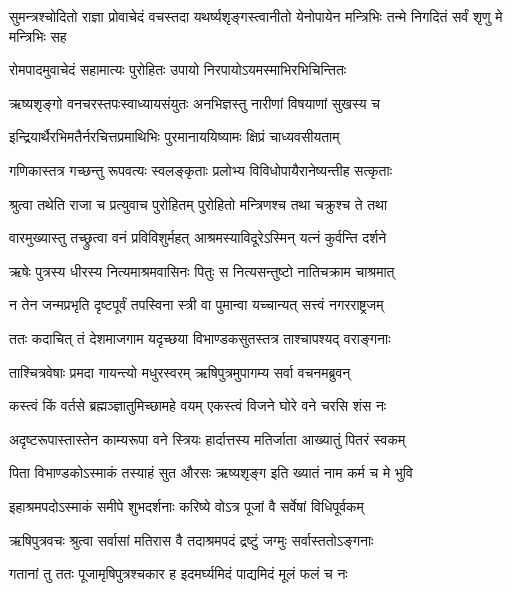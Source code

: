 
\threelineshloka
{सुमन्त्रश्चोदितो राज्ञा प्रोवाचेदं वचस्तदा}
{यथर्ष्यशृङ्गस्त्वानीतो येनोपायेन मन्त्रिभिः}
{तन्मे निगदितं सर्वं शृणु मे मन्त्रिभिः सह} %

\twolineshloka
{रोमपादमुवाचेदं सहामात्यः पुरोहितः}
{उपायो निरपायोऽयमस्माभिरभिचिन्तितः} %

\twolineshloka
{ऋष्यशृङ्गो वनचरस्तपःस्वाध्यायसंयुतः}
{अनभिज्ञस्तु नारीणां विषयाणां सुखस्य च} %

\twolineshloka
{इन्द्रियार्थैरभिमतैर्नरचित्तप्रमाथिभिः}
{पुरमानाययिष्यामः क्षिप्रं चाध्यवसीयताम्} %

\twolineshloka
{गणिकास्तत्र गच्छन्तु रूपवत्यः स्वलङ्कृताः}
{प्रलोभ्य विविधोपायैरानेष्यन्तीह सत्कृताः} %

\twolineshloka
{श्रुत्वा तथेति राजा च प्रत्युवाच पुरोहितम्}
{पुरोहितो मन्त्रिणश्च तथा चक्रुश्च ते तथा} %

\twolineshloka
{वारमुख्यास्तु तच्छ्रुत्वा वनं प्रविविशुर्महत्}
{आश्रमस्याविदूरेऽस्मिन् यत्नं कुर्वन्ति दर्शने} %

\twolineshloka
{ऋषेः पुत्रस्य धीरस्य नित्यमाश्रमवासिनः}
{पितुः स नित्यसन्तुष्टो नातिचक्राम चाश्रमात्} %

\twolineshloka
{न तेन जन्मप्रभृति दृष्टपूर्वं तपस्विना}
{स्त्री वा पुमान्वा यच्चान्यत् सत्त्वं नगरराष्ट्रजम्} %

\twolineshloka
{ततः कदाचित् तं देशमाजगाम यदृच्छया}
{विभाण्डकसुतस्तत्र ताश्चापश्यद् वराङ्गनाः} %

\twolineshloka
{ताश्चित्रवेषाः प्रमदा गायन्त्यो मधुरस्वरम्}
{ऋषिपुत्रमुपागम्य सर्वा वचनमब्रुवन्} %

\twolineshloka
{कस्त्वं किं वर्तसे ब्रह्मञ्ज्ञातुमिच्छामहे वयम्}
{एकस्त्वं विजने घोरे वने चरसि शंस नः} %

\twolineshloka
{अदृष्टरूपास्तास्तेन काम्यरूपा वने स्त्रियः}
{हार्दात्तस्य मतिर्जाता आख्यातुं पितरं स्वकम्} %

\twolineshloka
{पिता विभाण्डकोऽस्माकं तस्याहं सुत औरसः}
{ऋष्यशृङ्ग इति ख्यातं नाम कर्म च मे भुवि} %

\twolineshloka
{इहाश्रमपदोऽस्माकं समीपे शुभदर्शनाः}
{करिष्ये वोऽत्र पूजां वै सर्वेषां विधिपूर्वकम्} %

\twolineshloka
{ऋषिपुत्रवचः श्रुत्वा सर्वासां मतिरास वै}
{तदाश्रमपदं द्रष्टुं जग्मुः सर्वास्ततोऽङ्गनाः} %

\twolineshloka
{गतानां तु ततः पूजामृषिपुत्रश्चकार ह}
{इदमर्घ्यमिदं पाद्यमिदं मूलं फलं च नः} %

